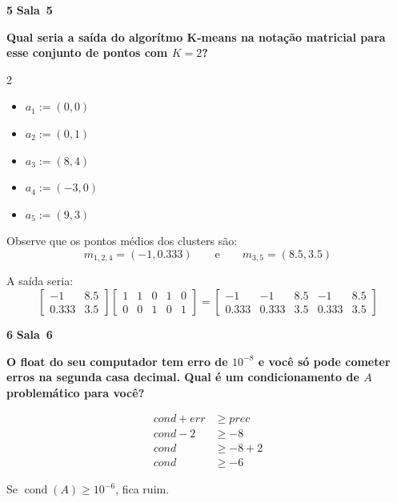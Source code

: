 \documentclass{article}
\DeclareMathOperator*{\cond}{cond}
\newenvironment{question}
    {\medskip\bfseries\large}
    {\medskip}
\newcounter{exe-list}
\newenvironment{exe}[2][Sala]
    {\bigskip\noindent\par\ifthenelse{\equal{#1}{}}%
        {\textbf{\LARGE #2}}%
        {\textbf{\LARGE #1~#2}}%
    \medskip\noindent\par}
    {\bigskip}
\begin{document}
\begin{exe}{5}
    \begin{question}
        Qual seria a saída do algorítmo K-means
        na notação matricial para esse conjunto de pontos
        com \(K = 2\)?
        \begin{multicols}{2} \begin{itemize}
            \item[] \(a_1 := (0, 0)\)
            \item[] \(a_2 := (0, 1)\)
            \item[] \(a_3 := (8, 4)\)
            \item[] \(a_4 := (-3, 0)\)
            \item[] \(a_5 := (9, 3)\)
        \end{itemize} \end{multicols}
    \end{question}

    Observe que os pontos médios dos clusters são:
    \[
        m_{1,2,4} = (- 1, 0.333)
        \qquad\text{e}\qquad
        m_{3,5} = (8.5, 3.5)
    \]

    A saída seria:
    \[
        \begin{bmatrix}
            -1 & 8.5 \\
            0.333 & 3.5
        \end{bmatrix} \begin{bmatrix}
            1 & 1 & 0 & 1 & 0 \\
            0 & 0 & 1 & 0 & 1
        \end{bmatrix} =
        \begin{bmatrix}
            -1 & -1 & 8.5 & -1 & 8.5 \\
            0.333 & 0.333 & 3.5 & 0.333 & 3.5
        \end{bmatrix}
    \]
\end{exe}

\begin{exe}{6}
    \begin{question}
        O float do seu computador tem erro de \(10^{-8}\)
        e você só pode cometer erros na segunda casa decimal.
        Qual é um condicionamento de \(A\)
        problemático para você?
    \end{question}

    \begin{align*}
        cond + err &\ge prec \\
        cond - 2 &\ge -8 \\
        cond &\ge - 8 + 2 \\
        cond &\ge - 6
    \end{align*}

    Se \(\cond(A) \ge 10^{-6}\), fica ruim.
\end{exe}
\end{document}
